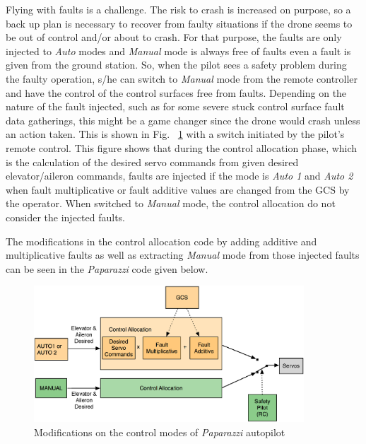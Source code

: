 Flying with faults is a challenge. 
The risk to crash is increased on purpose, so a back up plan is necessary to recover from faulty situations if the drone seems to be out of control and/or about to crash. 
For that purpose, the faults are only injected to \emph{Auto} modes and \emph{Manual} mode is always free of faults even a fault is given from the ground station. 
So, when the pilot sees a safety problem during the faulty operation, s/he can switch to \emph{Manual} mode from the remote controller and have the control of the control surfaces free from faults. 
Depending on the nature of the fault injected, such as for some severe stuck control surface fault data gatherings, this might be a game changer since the drone would crash unless an action taken.  
This is shown in Fig. ~\ref{fig:faultInjectionPaparazzi} with a switch initiated by the pilot's remote control. 
This figure shows that during the control allocation phase, which is the calculation of the desired servo commands from given desired elevator/aileron commands, faults are injected if the mode is \emph{Auto 1} and \emph{Auto 2} when fault multiplicative or fault additive values are changed from the GCS by the operator.  When switched to \emph{Manual} mode, the control allocation do not consider the injected faults. 

The modifications in the control allocation code by adding additive and multiplicative faults as well as extracting  \emph{Manual} mode from those injected faults can be seen in the \emph{Paparazzi} code given below. 


\begin{figure}
\begin{center}
\includegraphics[width=0.9\textwidth]{figures/faultInjectionPprz}    %
\caption{Modifications on the control modes of \emph{Paparazzi} autopilot} 
\label{fig:faultInjectionPaparazzi}
\end{center}
\end{figure}


